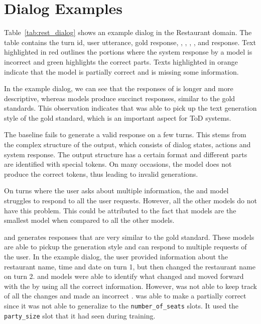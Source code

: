 \section{Dialog Examples}
\label{sec:appendix_dialogs}

Table~\ref{tab:rest_dialog} shows an example dialog in the Restaurant domain. The table contains the turn id, user utterance, gold response, {\soloist}, {\autotod}, {\gpt}, {\llamai}, and {\flan} response. 
Text highlighted in red outlines the portions where the system response by a model is incorrect and green highlights the correct parts. Texts highlighted in orange indicate that the model is partially correct and is missing some information.

In the example dialog, we can see that the responses of {\autotod} is longer and more descriptive, whereas {\oursys} models produce succinct responses, similar to the gold standards. This observation indicates that {\oursys} was able to pick up the text generation style of the gold standard, which is an important aspect for ToD systems.

The baseline {\soloist} fails to generate a valid response on a few turns. This stems from the complex structure of the output, which consists of dialog states, actions and system response. The output structure has a certain format and different parts are identified with special tokens. On many occasions, the model does not produce the correct tokens, thus leading to invalid generations. 

On turns where the user asks about multiple information, the {\gpt} and {\soloist} model struggles to respond to all the user requests. However, all the other models do not have this problem. This could be attributed to the fact that {\gpt} models are the smallest model when compared to all the other models.

{\llamai} and {\flan} generates responses that are very similar to the gold standard. These models are able to pickup the generation style and can respond to multiple requests of the user. In the example dialog, the user provided information about the restaurant name, time and date on turn 1, but then changed the restaurant name on turn 2. {\llamai} and {\flan} models were able to identify what changed and moved forward with the {\apicall} by using all the correct information. However, {\autotod} was not able to keep track of all the changes and made an incorrect {\apicall}. {\soloist} was able to make a partially correct {\apicall} since it was not able to generalize to the \texttt{number\_of\_seats} slots. It used the \texttt{party\_size} slot that it had seen during training. 

